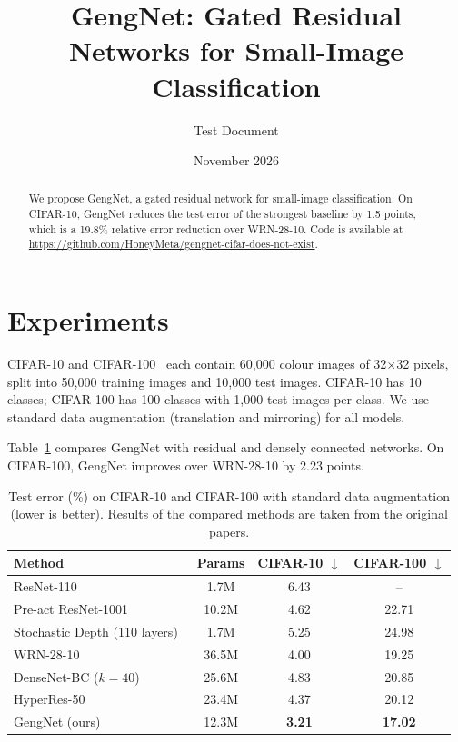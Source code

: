 \documentclass{article}
\title{GengNet: Gated Residual Networks for Small-Image Classification}
\author{Test Document}
\date{November 2026}
\begin{document}
\maketitle

\begin{abstract}
We propose GengNet, a gated residual network for small-image classification.
On CIFAR-10, GengNet reduces the test error of the strongest baseline by 1.5 points,
which is a 19.8\% relative error reduction over WRN-28-10.
Code is available at \url{https://github.com/HoneyMeta/gengnet-cifar-does-not-exist}.
\end{abstract}

\section{Experiments}
CIFAR-10 and CIFAR-100~\cite{krizhevsky2009learning} each contain 60,000 colour images of
32$\times$32 pixels, split into 50,000 training images and 10,000 test images.
CIFAR-10 has 10 classes; CIFAR-100 has 100 classes with 1,000 test images per class.
We use standard data augmentation (translation and mirroring) for all models.

Table~\ref{tab:sota} compares GengNet with residual and densely connected networks.
On CIFAR-100, GengNet improves over WRN-28-10 by 2.23 points.

\begin{table}[t]
\centering
\caption{Test error (\%) on CIFAR-10 and CIFAR-100 with standard data augmentation (lower is better).
Results of the compared methods are taken from the original papers.}
\label{tab:sota}
\begin{tabular}{lccc}
\toprule
Method & Params & CIFAR-10 $\downarrow$ & CIFAR-100 $\downarrow$ \\
\midrule
ResNet-110~\cite{he2016deep} & 1.7M & 6.43 & -- \\
Pre-act ResNet-1001~\cite{he2016identity} & 10.2M & 4.62 & 22.71 \\
Stochastic Depth (110 layers)~\cite{huang2016deep} & 1.7M & 5.25 & 24.98 \\
WRN-28-10~\cite{zagoruyko2016wide} & 36.5M & 4.00 & 19.25 \\
DenseNet-BC ($k=40$)~\cite{huang2017densely} & 25.6M & 4.83 & 20.85 \\
HyperRes-50~\cite{moreau2019hyper} & 23.4M & 4.37 & 20.12 \\
\midrule
GengNet (ours) & 12.3M & \textbf{3.21} & \textbf{17.02} \\
\bottomrule
\end{tabular}
\end{table}
\end{document}
